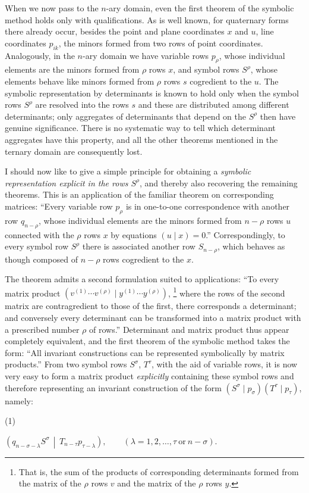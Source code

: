 \documentclass[11pt]{article}
\newcommand{\NoetherSrcNote}[2]{%
  \begingroup
  \renewcommand{\thefootnote}{[#1]}%
  \footnote{#2}%
  \endgroup
}
\providecommand{\srcnumdisplay}[3][3.2em]{%
  \par\smallskip\noindent
  \begin{minipage}[t]{#1}\vspace*{0pt}#2\end{minipage}%
  \begin{minipage}[t]{\dimexpr\linewidth-#1\relax}\vspace*{0pt}\centering
  \(\displaystyle #3\)
  \end{minipage}\par\smallskip}
\begin{document}
When we now pass to the $n$-ary domain, even the first theorem of the symbolic method holds only with qualifications. As is well known, for quaternary forms there already occur, besides the point and plane coordinates $x$ and $u$, line coordinates $p_{ik}$, the minors formed from two rows of point coordinates. Analogously, in the $n$-ary domain we have variable rows $p_\rho$, whose individual elements are the minors formed from $\rho$ rows $x$, and symbol rows $S^\rho$, whose elements behave like minors formed from $\rho$ rows $s$ cogredient to the $u$. The symbolic representation by determinants is known to hold only when the symbol rows $S^\rho$ are resolved into the rows $s$ and these are distributed among different determinants; only aggregates of determinants that depend on the $S^\rho$ then have genuine significance. There is no systematic way to tell which determinant aggregates have this property, and all the other theorems mentioned in the ternary domain are consequently lost.

I should now like to give a simple principle for obtaining a \emph{symbolic representation explicit in the rows $S^\rho$}, and thereby also recovering the remaining theorems. This is an application of the familiar theorem on corresponding matrices: ``Every variable row $p_\rho$ is in one-to-one correspondence with another row $q_{n-\rho}$, whose individual elements are the minors formed from $n-\rho$ rows $u$ connected with the $\rho$ rows $x$ by equations $(u\mid x)=0$.'' Correspondingly, to every symbol row $S^\rho$ there is associated another row $S_{n-\rho}$, which behaves as though composed of $n-\rho$ rows cogredient to the $x$.

The theorem admits a second formulation suited to applications: ``To every matrix product $(v^{(1)}\cdots v^{(\rho)}\mid y^{(1)}\cdots y^{(\rho)})$,\NoetherSrcNote{103:1}{That is, the sum of the products of corresponding determinants formed from the matrix of the $\rho$ rows $v$ and the matrix of the $\rho$ rows $y$.} where the rows of the second matrix are contragredient to those of the first, there corresponds a determinant; and conversely every determinant can be transformed into a matrix product with a prescribed number $\rho$ of rows.'' Determinant and matrix product thus appear completely equivalent, and the first theorem of the symbolic method takes the form: ``All invariant constructions can be represented symbolically by matrix products.'' From two symbol rows $S^\sigma$, $T^\tau$, with the aid of variable rows, it is now very easy to form a matrix product \emph{explicitly} containing these symbol rows and therefore representing an invariant construction of the form $(S^\sigma\mid p_\sigma)(T^\tau\mid p_\tau)$, namely:
\srcnumdisplay{(1)}{%
  \left(q_{n-\sigma-\lambda}S^\sigma\,\middle|\,T_{n-\tau}p_{\tau-\lambda}\right),
  \qquad (\lambda=1,2,\ldots,\tau\ \text{or}\ n-\sigma).}
\end{document}
